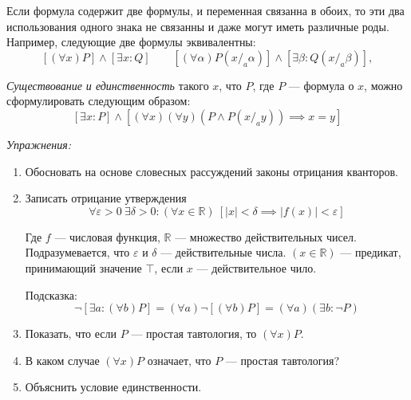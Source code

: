 Если формула содержит две формулы, и переменная
связанна в обоих, то эти два использования
одного знака не связанны и даже могут иметь различные роды.
Например, следующие две формулы эквивалентны:
\[
	[(\forall x)P]\land[\exists x:Q]\qquad
	[(\forall \alpha)P(x/_{a}\alpha)]\land[\exists \beta:Q(x/_{a}\beta)],
\]

\label{page:exists_only}
{\it Существование и единственность} такого $x$, что $P$,
где $P$ --- формула о $x$, можно сформулировать следующим образом:
\[
	[\exists x:P]\land [(\forall x)(\forall y)(P\land P(x/_{a}y))\implies x=y]
\]

\vspace{1em}
{\it Упражнения:}
\begin{enumerate}
	\item{}Обосновать на основе словесных рассуждений законы отрицания
	кванторов\label{ex:quantor_neg_def}.
	\item{}Записать отрицание утверждения
	\[
		\forall \varepsilon>0~\exists \delta>0:
		(\forall x\in\mathbb{R})~[|x|<\delta\implies |f(x)|<\varepsilon]
	\]

	Где $f$ --- числовая функция, $\mathbb{R}$ --- множество действительных чисел.
	Подразумевается, что $\varepsilon$ и $\delta$ --- действительные числа.
	${(x\in\mathbb{R})}$ --- предикат, принимающий значение $\top$,
	если $x$ --- действительное чило.

	Подсказка:
	\[
		\lnot[\exists a:(\forall b)P]=(\forall a)\lnot[(\forall b)P]=
		(\forall a)(\exists b:\lnot P)
	\]

	\item{}Показать, что если $P$ --- простая тавтология, то $(\forall x)P$.

	\item{}В каком случае $(\forall x)P$ означает, что $P$ --- простая тавтология?

	\item{}Объяснить условие единственности.
\end{enumerate}
